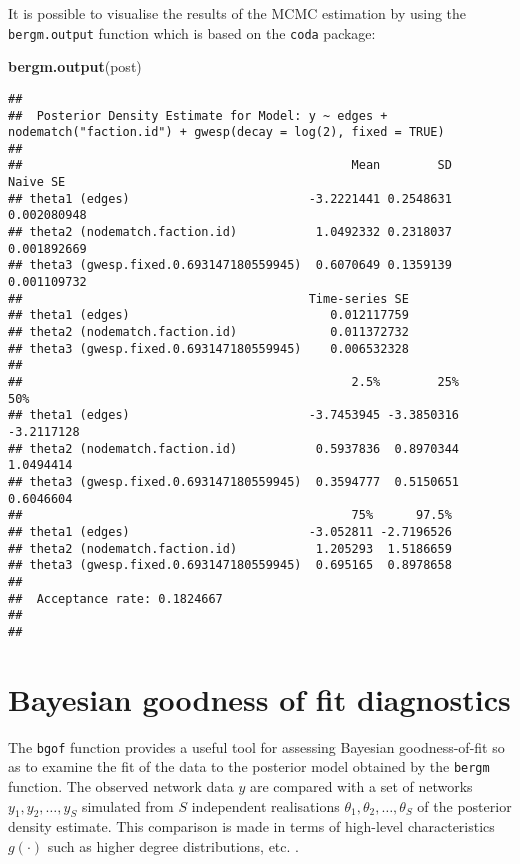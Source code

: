 \documentclass[]{book}
\newenvironment{Shaded}{\begin{snugshade}}{\end{snugshade}}
\newcommand{\KeywordTok}[1]{\textcolor[rgb]{0.13,0.29,0.53}{\textbf{{#1}}}}
\newcommand{\NormalTok}[1]{{#1}}
\begin{document}
It is possible to visualise the results of the MCMC estimation by using
the \texttt{bergm.output} function which is based on the \texttt{coda}
package:

\begin{Shaded}
\begin{Highlighting}[]
\KeywordTok{bergm.output}\NormalTok{(post)}
\end{Highlighting}
\end{Shaded}

\begin{verbatim}
## 
##  Posterior Density Estimate for Model: y ~ edges + nodematch("faction.id") + gwesp(decay = log(2), fixed = TRUE) 
##  
##                                              Mean        SD    Naive SE
## theta1 (edges)                         -3.2221441 0.2548631 0.002080948
## theta2 (nodematch.faction.id)           1.0492332 0.2318037 0.001892669
## theta3 (gwesp.fixed.0.693147180559945)  0.6070649 0.1359139 0.001109732
##                                        Time-series SE
## theta1 (edges)                            0.012117759
## theta2 (nodematch.faction.id)             0.011372732
## theta3 (gwesp.fixed.0.693147180559945)    0.006532328
## 
##                                              2.5%        25%        50%
## theta1 (edges)                         -3.7453945 -3.3850316 -3.2117128
## theta2 (nodematch.faction.id)           0.5937836  0.8970344  1.0494414
## theta3 (gwesp.fixed.0.693147180559945)  0.3594777  0.5150651  0.6046604
##                                              75%      97.5%
## theta1 (edges)                         -3.052811 -2.7196526
## theta2 (nodematch.faction.id)           1.205293  1.5186659
## theta3 (gwesp.fixed.0.693147180559945)  0.695165  0.8978658
## 
##  Acceptance rate: 0.1824667 
##  
## 
\end{verbatim}

\section{Bayesian goodness of fit
diagnostics}\label{bayesian-goodness-of-fit-diagnostics}

The \texttt{bgof} function provides a useful tool for assessing Bayesian
goodness-of-fit so as to examine the fit of the data to the posterior
model obtained by the \texttt{bergm} function. The observed network data
\(y\) are compared with a set of networks \(y_1, y_2, \dots, y_S\)
simulated from \(S\) independent realisations
\(\theta_1, \theta_2,\dots,\theta_S\) of the posterior density estimate.
This comparison is made in terms of high-level characteristics
\(g(\cdot)\) such as higher degree distributions, etc.
\citep{hun:goo:han08}.
\end{document}
